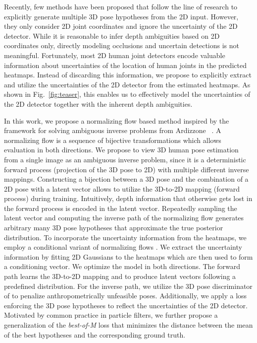 \documentclass[10pt,twocolumn,letterpaper]{article}
\begin{document}
Recently, few methods \cite{Jahangiri2017GeneratingMD,Li_2019_CVPR,li2020weakly,oikarinen2020graphmdn,Sharma_2019_ICCV} have been proposed that follow the line of research to explicitly generate multiple 3D pose hypotheses from the 2D input.
However, they only consider 2D joint coordinates and ignore the uncertainty of the 2D detector.
While it is reasonable to infer depth ambiguities based on 2D coordinates only, 
directly modeling occlusions and uncertain detections is not meaningful.
Fortunately, most 2D human joint detectors encode valuable information about uncertainties of the location of human joints in the predicted heatmaps.
Instead of discarding this information, we propose to explicitly extract and utilize the uncertainties of the 2D detector from the estimated heatmaps.
As shown in Fig.~\ref{fig:teaser}, this enables us to effectively model the uncertainties of the 2D detector together with the inherent depth ambiguities.

In this work, we propose a normalizing flow based method inspired by the framework for solving ambiguous inverse problems from Ardizzone \etal~\cite{ArdizzoneINN}.
A normalizing flow \cite{pmlr-v37-rezende15,doi:10.1002/cpa.21423,tabak2010} is a sequence of bijective transformations which allows evaluation in both directions.
We propose to view 3D human pose estimation from a single image as an ambiguous inverse problem, since it is a deterministic forward process (\ie projection of the 3D pose to 2D) with multiple different inverse mappings.
Constructing a bijection between a 3D pose and the combination of a 2D pose with a latent vector allows to utilize the 3D-to-2D mapping (forward process) during training.
Intuitively, depth information that otherwise gets lost in the forward process is encoded in the latent vector.
Repeatedly sampling the latent vector and
computing the inverse path of the normalizing flow generates
arbitrary many 3D pose hypotheses that approximate the true posterior distribution.
To incorporate the uncertainty information from the heatmaps, we employ a conditional variant of normalizing flows \cite{Ardizzone2019a,winkler2019learning}.
We extract the uncertainty information by fitting 2D Gaussians to the heatmaps
which are then used to form a conditioning vector.
We optimize the model in both directions.
The forward path learns the 3D-to-2D mapping and to produce latent vectors following a predefined distribution. 
For the inverse path, we utilize the 3D pose discriminator of \cite{Wandt2019RepNet} to penalize anthropometrically unfeasible poses.
Additionally, we apply a loss enforcing the 3D pose hypotheses to reflect the uncertainties of the 2D detector.
Motivated by common practice in particle filters, we further propose a generalization of the \textit{best-of-M} loss \cite{NIPS2012_cfbce4c1} that minimizes the distance between the mean of the  best hypotheses and the corresponding ground truth.
\end{document}
